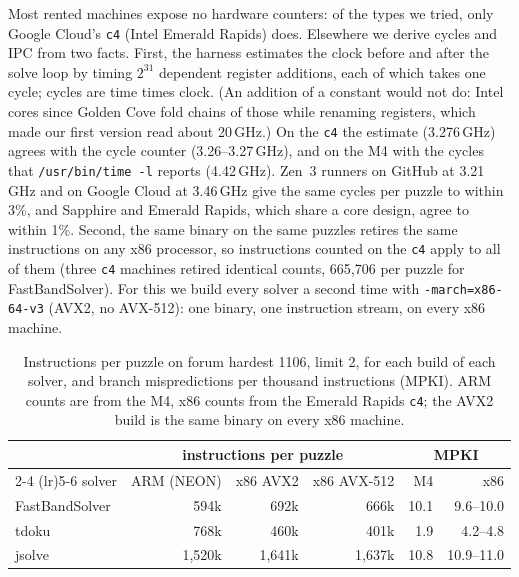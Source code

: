 \documentclass[11pt]{article}
\theoremstyle{definition}
\theoremstyle{plain}
\begin{document}
Most rented machines expose no hardware counters: of the types we tried, only Google Cloud's \texttt{c4} (Intel Emerald
Rapids) does. Elsewhere we derive cycles and IPC from two facts. First, the harness estimates the clock before and
after the solve loop by timing $2^{31}$ dependent register additions, each of which takes one cycle; cycles are time
times clock. (An addition of a constant would not do: Intel cores since Golden Cove fold chains of those while
renaming registers, which made our first version read about 20\,GHz.) On the \texttt{c4} the estimate (3.276\,GHz)
agrees with the cycle counter (3.26--3.27\,GHz), and on the M4 with the cycles that \texttt{/usr/bin/time -l}
reports (4.42\,GHz). Zen~3 runners on GitHub
at 3.21\,GHz and on Google Cloud at 3.46\,GHz give the same cycles per puzzle to within 3\%, and Sapphire and Emerald
Rapids, which share a core design, agree to within 1\%. Second, the same binary on the same puzzles retires the same
instructions on any x86 processor, so instructions counted on the \texttt{c4} apply to all of them (three \texttt{c4}
machines retired identical counts, 665{,}706 per puzzle for FastBandSolver). For this we build every solver a second
time with \texttt{-march=x86-64-v3} (AVX2, no AVX-512): one binary, one instruction stream, on every x86 machine.

\begin{table}[t]
\centering
\caption{Instructions per puzzle on forum hardest 1106, limit 2, for each build of each solver, and branch
mispredictions per thousand instructions (MPKI). ARM counts are from the M4, x86 counts from the Emerald Rapids
\texttt{c4}; the AVX2 build is the same binary on every x86 machine.}
\label{tab:instructions}
\small
\begin{tabular}{lrrrrr}
\toprule
& \multicolumn{3}{c}{instructions per puzzle} & \multicolumn{2}{c}{MPKI} \\
\cmidrule(lr){2-4} \cmidrule(lr){5-6}
solver & ARM (NEON) & x86 AVX2 & x86 AVX-512 & M4 & x86 \\
\midrule
FastBandSolver & 594k & 692k & 666k & 10.1 & 9.6--10.0 \\
tdoku & 768k & 460k & 401k & 1.9 & 4.2--4.8 \\
jsolve & 1{,}520k & 1{,}641k & 1{,}637k & 10.8 & 10.9--11.0 \\
\bottomrule
\end{tabular}
\end{table}
\end{document}
